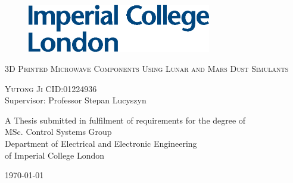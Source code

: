 \thispagestyle{empty}
\newcommand{\HRule}{\rule{\linewidth}{0.5mm}} %




\begin{figure}[t]
  \centering
  \flushleft\includegraphics[height=2.1cm]{Figs//imp1.eps}
\end{figure}

\begin{center}
\null {}
\renewcommand{\baselinestretch}{3}


\textsc{\huge{3D Printed Microwave Components}}
\null {}
\textsc{\huge{Using Lunar and Mars Dust Simulants}}






\textsc{\large{Yutong Ji   CID:01224936} }\\
\null {}
Supervisor: Professor Stepan Lucyszyn\\

A Thesis submitted in fulfilment of requirements for the degree of\\
MSc. Control Systems Group\\
Department of Electrical and Electronic Engineering\\
of Imperial College London

\today

\end{center}


